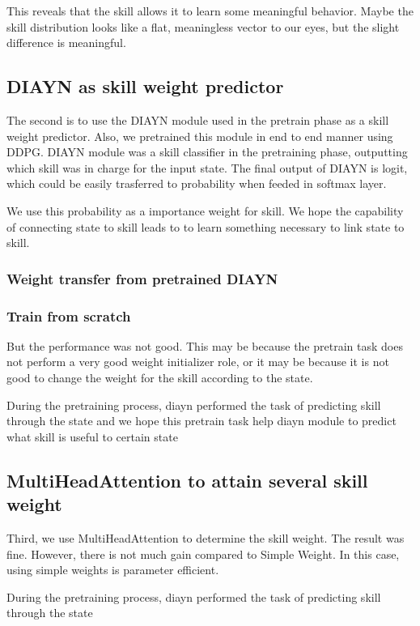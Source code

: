 This reveals that the skill allows it to learn some meaningful behavior.
Maybe the skill distribution looks like a flat, meaningless vector to our eyes, but the slight difference is meaningful.

\subsection{DIAYN as skill weight predictor}
The second is to use the DIAYN module used in the pretrain phase as a skill weight predictor. Also, we pretrained this module in end to end manner using DDPG.
DIAYN module was a skill classifier in the pretraining phase, outputting which skill was in charge for the input state.
The final output of DIAYN is logit, which could be easily trasferred to probability when feeded in softmax layer.

We use this probability as a importance weight for skill.
We hope the capability of connecting state to skill leads to 
 to learn something necessary to link state to skill.
\subsubsection{Weight transfer from pretrained DIAYN}

\subsubsection{Train from scratch}

But the performance was not good. This may be because the pretrain task does not perform a very good weight initializer role, or it may be because it is not good to change the weight for the skill according to the state.

During the pretraining process, diayn performed the task of predicting skill through the state and we hope this pretrain task help diayn module to predict what skill is useful to certain state

\subsection{MultiHeadAttention to attain several skill weight}
Third, we use MultiHeadAttention to determine the skill weight.
The result was fine. However, there is not much gain compared to Simple Weight. In this case, using simple weights is parameter efficient.

During the pretraining process, diayn performed the task of predicting skill through the state








